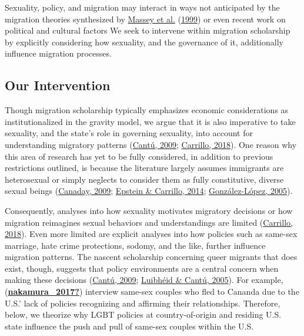 \documentclass[
  11pt,
]{article}
\begin{document}
Sexuality, policy, and migration may interact in ways not anticipated by the migration theories synthesized by \protect\hyperlink{ref-massey_1999}{Massey et al.} (\protect\hyperlink{ref-massey_1999}{1999}) or even recent work on political and cultural factors We seek to intervene within migration scholarship by explicitly considering how sexuality, and the governance of it, additionally influence migration processes.

\hypertarget{our-intervention}{%
\subsection{Our Intervention}\label{our-intervention}}

Though migration scholarship typically emphasizes economic considerations as institutionalized in the gravity model, we argue that it is also imperative to take sexuality, and the state's role in governing sexuality, into account for understanding migratory patterns (\protect\hyperlink{ref-cantu_2009}{Cantú, 2009}; \protect\hyperlink{ref-carrillo_2018}{Carrillo, 2018}). One reason why this area of research has yet to be fully considered, in addition to previous restrictions outlined, is because the literature largely assumes immigrants are heterosexual or simply neglects to consider them as fully constitutive, diverse sexual beings (\protect\hyperlink{ref-canaday_2009}{Canaday, 2009}; \protect\hyperlink{ref-epstein_2014}{Epstein \& Carrillo, 2014}; \protect\hyperlink{ref-gonzalez-lopez_2005}{González-López, 2005}).

Consequently, analyses into how sexuality motivates migratory decisions or how migration reimagines sexual behaviors and understandings are limited (\protect\hyperlink{ref-carrillo_2018}{Carrillo, 2018}). Even more limited are explicit analyses into how policies such as same-sex marriage, hate crime protections, sodomy, and the like, further influence migration patterns. The nascent scholarship concerning queer migrants that does exist, though, suggests that policy environments are a central concern when making these decisions (\protect\hyperlink{ref-cantu_2009}{Cantú, 2009}; \protect\hyperlink{ref-luibheid_2005}{Luibhéid \& Cantú, 2005}). For example, (\protect\hyperlink{ref-nakamura_2017}{\textbf{nakamura\_2017?}}) interview same-sex couples who fled to Cananda due to the U.S.' lack of policies recognizing and affirming their relationships. Therefore, below, we theorize why LGBT policies at country-of-origin and residing U.S. state influence the push and pull of same-sex couples within the U.S.
\end{document}
